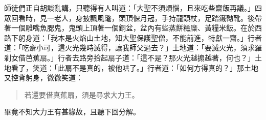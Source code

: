師徒們正自胡談亂講，只聽得有人叫道：「大聖不須煩惱，且來吃些齋飯再議。」四眾回看時，見一老人，身披飄風氅，頭頂偃月冠，手持龍頭杖，足踏鐵靿靴。後帶著一個雕嘴魚腮鬼，鬼頭上頂著一個銅盆，盆內有些蒸餅糕糜、黃糧米飯。在於西路下躬身道：「我本是火焰山土地，知大聖保護聖僧，不能前進，特獻一齋。」行者道：「吃齋小可，這火光幾時滅得，讓我師父過去？」土地道：「要滅火光，須求羅剎女借芭蕉扇。」行者去路旁拾起扇子道：「這不是？那火光越搧越著，何也？」土地看了，笑道：「此扇不是真的，被他哄了。」行者道：「如何方得真的？」那土地又控背躬身，微微笑道：
\begin{quote}
若還要借真蕉扇，須是尋求大力王。
\end{quote}

畢竟不知大力王有甚緣故，且聽下回分解。
